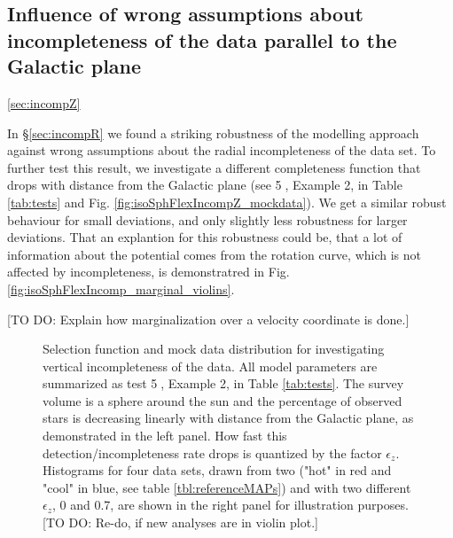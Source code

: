 \subsection{Influence of wrong assumptions about incompleteness of the data parallel to the Galactic plane} \ref{sec:incompZ}

In \S\ref{sec:incompR} we found a striking robustness of the \RM modelling approach against wrong assumptions about the radial incompleteness of the data set. To further test this result, we investigate a different completeness function that drops with distance from the Galactic plane (see \textcircled{5}, Example 2, in Table \ref{tab:tests} and Fig. \ref{fig:isoSphFlexIncompZ_mockdata}). We get a similar robust behaviour for small deviations, and only slightly less robustness for larger deviations. That an explantion for this robustness could be, that a lot of information about the potential comes from the rotation curve, which is not affected by incompleteness, is demonstratred in Fig. \ref{fig:isoSphFlexIncomp_marginal_violins}.

[TO DO: Explain how marginalization over a velocity coordinate is done.]


\begin{figure}
\caption{Selection function and mock data distribution for investigating vertical incompleteness of the data. All model parameters are summarized as test \textcircled{5}, Example 2, in Table \ref{tab:tests}. The survey volume is a sphere around the sun and the percentage of observed stars is decreasing linearly with distance from the Galactic plane, as demonstrated in the left panel. How fast this detection/incompleteness rate drops is quantized by the factor $\epsilon_z$. Histograms for four data sets, drawn from two \MAPs ("hot" in red and "cool" in blue, see table \ref{tbl:referenceMAPs}) and with two different $\epsilon_z$, 0 and 0.7, are shown in the right panel for illustration purposes. [TO DO: Re-do, if new analyses are in violin plot.]} 
\label{fig:incompZ_mockdata}
\end{figure}


